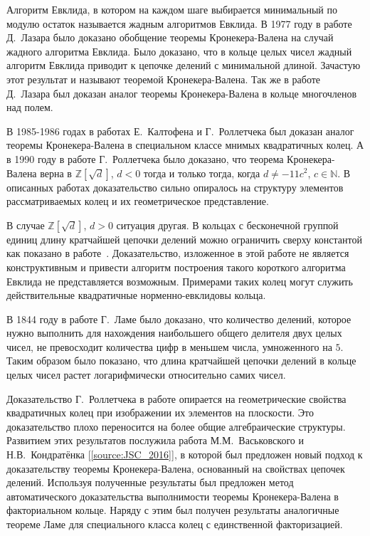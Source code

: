 \documentclass[_00_dissertation.tex]{subfiles}
\begin{document}
Алгоритм Евклида, в котором на каждом шаге выбирается минимальный по модулю остаток называется жадным алгоритмов Евклида.
В 1977 году в работе Д.~Лазара \cite{source:Lazard} было доказано обобщение теоремы Кронекера-Валена на случай жадного алгоритма Евклида.
Было доказано, что в кольце целых чисел жадный алгоритм Евклида приводит к цепочке делений с минимальной длиной.
Зачастую этот результат и называют теоремой Кронекера-Валена.
Так же в работе Д.~Лазара был доказан аналог теоремы Кронекера-Валена в кольце многочленов над полем.

В 1985-1986 годах в работах Е.~Калтофена и Г.~Роллетчека \cite{source:Kaltofen, source:Rolletschek_1986} был доказан аналог теоремы Кронекера-Валена в специальном классе мнимых квадратичных колец.
А в 1990 году в работе Г.~Роллетчека \cite{source:Rolletschek_1990} было доказано, что теорема Кронекера-Валена верна в $\mathbb{Z}[\sqrt{d}]$, $d < 0$ тогда и только тогда, когда $d\neq-11c^{2}$, $c\in\mathbb{N}$.
В описанных работах доказательство сильно опиралось на структуру элементов рассматриваемых колец и их геометрическое представление.

В случае $\mathbb{Z}[\sqrt{d}]$, $d > 0$ ситуация другая.
В кольцах с бесконечной группой единиц длину кратчайшей цепочки делений можно ограничить сверху константой как показано в работе~\cite{source:Cooke}.
Доказательство, изложенное в этой работе не является конструктивным и привести алгоритм построения такого короткого алгоритма Евклида не представляется возможным.
Примерами таких колец могут служить действительные квадратичные норменно-евклидовы кольца.

В 1844 году в работе Г.~Ламе было доказано, что количество делений, которое нужно выполнить для нахождения наибольшего общего делителя двух целых чисел, не превосходит количества цифр в меньшем числа, умноженного на $5$.
Таким образом было показано, что длина кратчайшей цепочки делений в кольце целых чисел растет логарифмически относительно самих чисел.

Доказательство Г.~Роллетчека в работе \cite{source:Rolletschek_1990} опирается на геометрические свойства квадратичных колец при изображении их элементов на плоскости.
Это доказательство плохо переносится на более общие алгебраические структуры.
Развитием этих результатов послужила работа М.М.~Васьковского и Н.В.~Кондратёнка [\ref{source:JSC_2016}], в которой был предложен новый подход к доказательству теоремы Кронекера-Валена, основанный на свойствах цепочек делений.
Используя полученные результаты был предложен метод автоматического доказательства выполнимости теоремы Кронекера-Валена в факториальном кольце.
Наряду с этим был получен результаты аналогичные теореме Ламе для специального класса колец с единственной факторизацией.
\end{document}
